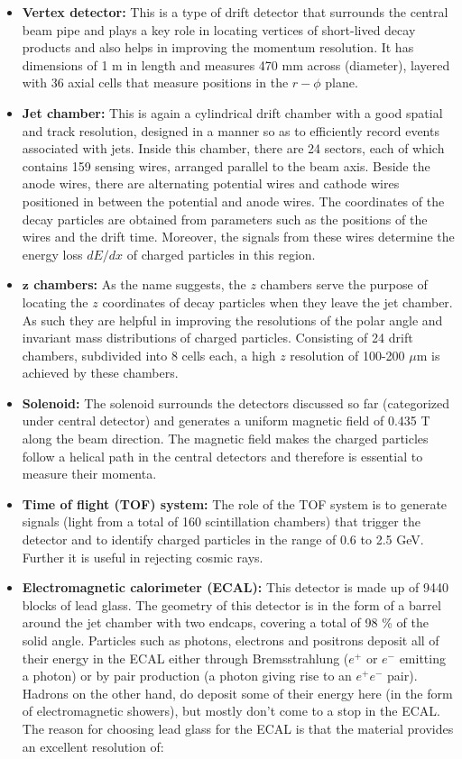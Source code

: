 \begin{itemize}
\item \textbf{Vertex detector:} This is a type of drift detector that surrounds the central beam pipe and plays a key role in locating vertices of short-lived decay products and also helps in improving the momentum resolution. It has dimensions of 1 m in length and measures 470 mm across (diameter), layered with 36 axial cells that measure positions in the $r-\phi$ plane.  
\item \textbf{Jet chamber:} This is again a cylindrical drift chamber with a good spatial and track resolution, designed in a manner so as to efficiently record events associated with jets. Inside this chamber, there are 24 sectors, each of which contains 159 sensing wires, arranged parallel to the beam axis. Beside the anode wires, there are alternating potential wires and cathode wires positioned in between the potential and anode wires. The coordinates of the decay particles are obtained from parameters such as the positions of the wires and the drift time. Moreover, the signals from these wires determine the energy loss $dE/dx$ of charged particles in this region.
\item \textbf{$\mathbf{z}$ chambers:} As the name suggests, the $z$ chambers serve the purpose of locating the $z$ coordinates of decay particles when they leave the jet chamber. As such they are helpful in improving the resolutions of the polar angle and invariant mass distributions of charged particles. Consisting of 24 drift chambers, subdivided into 8 cells each, a high $z$ resolution of 100-200 $\mu$m is achieved by these chambers.
\item \textbf{Solenoid:} The solenoid surrounds the detectors discussed so far (categorized under central detector) and generates a uniform magnetic field of 0.435 T along the beam direction. The magnetic field makes the charged particles follow a helical path in the central detectors and therefore is essential to measure their momenta. 
\item \textbf{Time of flight (TOF) system:} The role of the TOF system is to generate signals (light from a total of 160 scintillation chambers) that trigger the detector and to identify charged particles in the range of 0.6 to 2.5 GeV. Further it is useful in rejecting cosmic rays.
\item \textbf{Electromagnetic calorimeter (ECAL):} This detector is made up of 9440 blocks of lead glass. The geometry of this detector is in the form of a barrel around the jet chamber with two endcaps, covering a total of 98 \% of the solid angle. Particles such as photons, electrons and positrons deposit all of their energy in the ECAL either through Bremsstrahlung ($e^{+}$ or $e^{-}$ emitting a photon) or by pair production (a photon giving rise to an $e^{+}e^{-}$ pair). Hadrons on the other hand, do deposit some of their energy here (in the form of electromagnetic showers), but mostly don't come to a stop in the ECAL. The reason for choosing lead glass for the ECAL is that the material provides an excellent resolution of:

\end{itemize}
